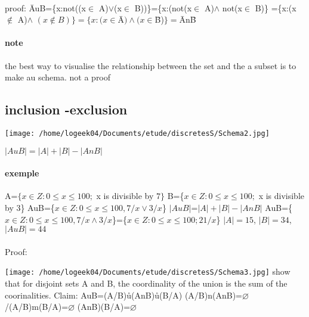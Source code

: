 \documentclass[a4paper,10pt]{article}
\begin{document}
{\paragraph{}
proof:
\={AuB}=\{x:not((x$\in$ A)$\vee$(x$\in$ B))\}=\{x:(not(x$\in$ A)$\wedge$ not(x$\in$ B)\}
\newline
=\{x:(x$\notin$ A)$\wedge$ $(x\notin B)\}=\{x:(x\in $\={A}$) \wedge(x\in $\={B})$\}= $\={A}n\={B}
\paragraph{note}
the best way to visualise the relationship between the set and the a subset is to make au schema. not a proof
\subsection{inclusion -exclusion}

\texttt{[image: /home/logeek04/Documents/etude/discretesS/Schema2.jpg]}

$|AuB|=|A|+|B|-|AnB|$
\paragraph{exemple}
A=$\{x\in Z:0\leq x\leq100;$ x is divisible by $7\}$
\newline
B=\{$x\in Z:0\leq x\leq100;$ x is divisible by 3\}
\newline
AuB=\{$x\in Z:0\leq x\leq 100,7/x\vee 3/x$\}
\newline
$|AuB|$=$|A|+|B|-|AnB|$
\newline
AuB=\{$x\in Z:0\leq x\leq 100,7/x\wedge 3/x$\}=\{$x\in Z:0\leq x\leq 100;21/x$\}
\newline
$|A|=15$, $|B|=34$, $|AuB|=44$
\paragraph{}
Proof:
\newline

\texttt{[image: /home/logeek04/Documents/etude/discretesS/Schema3.jpg]}
show that for disjoint sets A and B, the coordinality of the union is the sum of the coorinalities.
\newline
Claim:
\newline
AuB=(A/B)\r{u}(AnB)\r{u}(B/A)
\newline
(A/B)n(AnB)=$\varnothing$
\newline
/(A/B)m(B/A)=$\varnothing$
\newline
(AnB)(B/A)=$\varnothing$
\newline
}
\end{document}
